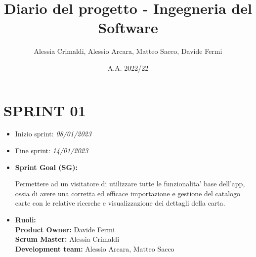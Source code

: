 \documentclass[a4paper, oneside]{article}
\title{Diario del progetto - Ingegneria del Software}
\date{A.A. 2022/22}
\author{Alessia Crimaldi, Alessio Arcara, Matteo Sacco, Davide Fermi}
\begin{document}
    \begin{landscape}
        \begin{titlepage}
            \maketitle
        \end{titlepage}
        \newpage
        \section{SPRINT 01}
        \begin{itemize}
            \item Inizio sprint: \textit{08/01/2023}
            \item Fine sprint: \textit{14/01/2023}
        \end{itemize}
        \begin{itemize}
            \item \textbf{Sprint Goal (SG):} \\
            \begin{indent}
                \newline Permettere ad un visitatore di utilizzare tutte le funzionalita' base dell'app, ossia di avere una corretta ed efficace importazione e gestione del catalogo carte con le relative ricerche e visualizzazione dei dettagli della carta.\\
            \end{indent}
        \end{itemize}
        \begin{itemize}
            \item \textbf{Ruoli:}\\
            \textbf{Product Owner:} Davide Fermi\\
            \textbf{Scrum Master:} Alessia Crimaldi\\
            \textbf{Development team:} Alessio Arcara, Matteo Sacco\\
        \end{itemize}
        \vspace{2mm} %

\end{landscape}
\end{document}
